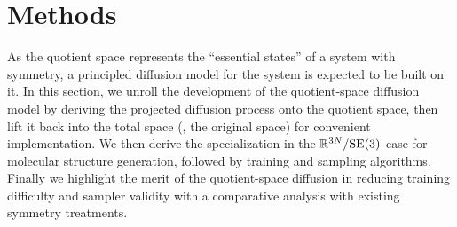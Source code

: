 \documentclass{article} %
\newcommand{\SE}{\mathrm{SE}}
\begin{document}
\section{Methods}\label{sec:methods}
\vspace{-3pt}

As the quotient space represents the ``essential states'' of a system with symmetry, a principled diffusion model for the system is expected to be built on it. In this section, we unroll the development of the quotient-space diffusion model by deriving the projected diffusion process onto the quotient space, then lift it back into the total space (\ie, the original space) for convenient implementation. We then derive the specialization in the $\bbR^{3N}/\SE(3)$ case for molecular structure generation, followed by training and sampling algorithms. Finally we highlight the merit of the quotient-space diffusion in reducing training difficulty and sampler validity with a comparative analysis with existing symmetry treatments.
\end{document}
